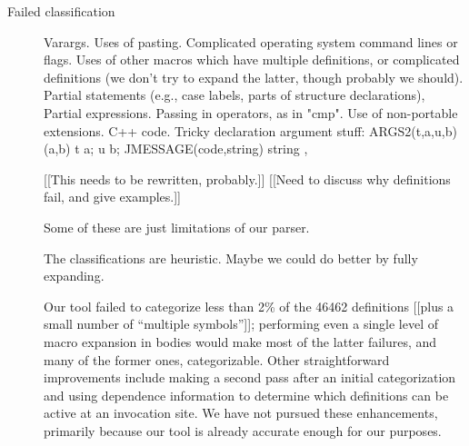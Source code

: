 \begin{description}
\item[Failed classification]

Varargs.
Uses of pasting.
Complicated operating system command lines or flags.
Uses of other macros which have multiple definitions, or complicated
        definitions (we don't try to expand the latter, though probably we should).
Partial statements (e.g., case labels, parts of structure declarations), Partial expressions.
Passing in operators, as in "cmp".
Use of non-portable extensions.
C++ code.
Tricky declaration argument stuff:  ARGS2(t,a,u,b) (a,b) t a; u b;
JMESSAGE(code,string) string ,



  [[This needs to be rewritten, probably.]]
  [[Need to discuss why definitions fail, and give examples.]]

  Some of these are just limitations of our parser.

  The classifications are heuristic.  Maybe we could do better by fully
  expanding.

  
  Our tool failed to categorize less than 2\% of the 46462 definitions
  [[plus a small number of ``multiple symbols'']]; performing even a single
  level of macro expansion in bodies would make most of the latter
  failures, and many of the former ones, categorizable.  Other
  straightforward improvements include making a second pass after an
  initial categorization and using dependence information to determine
  which definitions can be active at an invocation site.  We have not
  pursued these enhancements, primarily because our tool is already
  accurate enough for our purposes.




\end{description}

